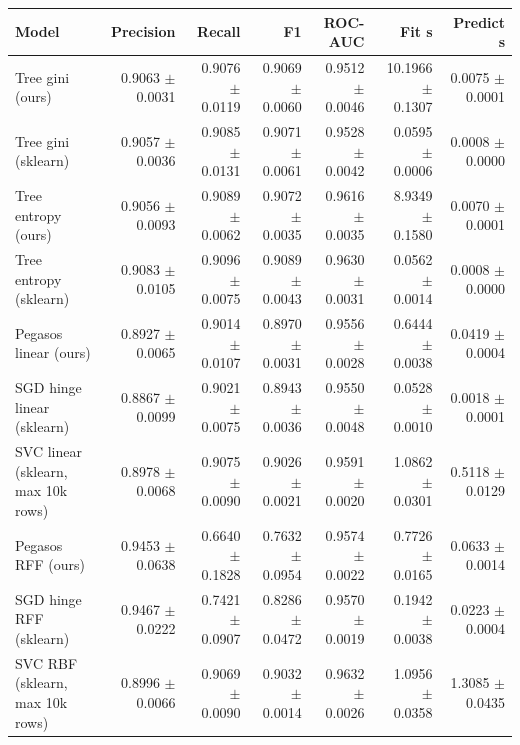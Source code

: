 \begin{tabular}{lrrrrrr}
\toprule
Model & Precision & Recall & F1 & ROC-AUC & Fit s & Predict s \\
\midrule
Tree gini (ours) & 0.9063 $\pm$ 0.0031 & 0.9076 $\pm$ 0.0119 & 0.9069 $\pm$ 0.0060 & 0.9512 $\pm$ 0.0046 & 10.1966 $\pm$ 0.1307 & 0.0075 $\pm$ 0.0001 \\
Tree gini (sklearn) & 0.9057 $\pm$ 0.0036 & 0.9085 $\pm$ 0.0131 & 0.9071 $\pm$ 0.0061 & 0.9528 $\pm$ 0.0042 & 0.0595 $\pm$ 0.0006 & 0.0008 $\pm$ 0.0000 \\
Tree entropy (ours) & 0.9056 $\pm$ 0.0093 & 0.9089 $\pm$ 0.0062 & 0.9072 $\pm$ 0.0035 & 0.9616 $\pm$ 0.0035 & 8.9349 $\pm$ 0.1580 & 0.0070 $\pm$ 0.0001 \\
Tree entropy (sklearn) & 0.9083 $\pm$ 0.0105 & 0.9096 $\pm$ 0.0075 & 0.9089 $\pm$ 0.0043 & 0.9630 $\pm$ 0.0031 & 0.0562 $\pm$ 0.0014 & 0.0008 $\pm$ 0.0000 \\
Pegasos linear (ours) & 0.8927 $\pm$ 0.0065 & 0.9014 $\pm$ 0.0107 & 0.8970 $\pm$ 0.0031 & 0.9556 $\pm$ 0.0028 & 0.6444 $\pm$ 0.0038 & 0.0419 $\pm$ 0.0004 \\
SGD hinge linear (sklearn) & 0.8867 $\pm$ 0.0099 & 0.9021 $\pm$ 0.0075 & 0.8943 $\pm$ 0.0036 & 0.9550 $\pm$ 0.0048 & 0.0528 $\pm$ 0.0010 & 0.0018 $\pm$ 0.0001 \\
SVC linear (sklearn, max 10k rows) & 0.8978 $\pm$ 0.0068 & 0.9075 $\pm$ 0.0090 & 0.9026 $\pm$ 0.0021 & 0.9591 $\pm$ 0.0020 & 1.0862 $\pm$ 0.0301 & 0.5118 $\pm$ 0.0129 \\
Pegasos RFF (ours) & 0.9453 $\pm$ 0.0638 & 0.6640 $\pm$ 0.1828 & 0.7632 $\pm$ 0.0954 & 0.9574 $\pm$ 0.0022 & 0.7726 $\pm$ 0.0165 & 0.0633 $\pm$ 0.0014 \\
SGD hinge RFF (sklearn) & 0.9467 $\pm$ 0.0222 & 0.7421 $\pm$ 0.0907 & 0.8286 $\pm$ 0.0472 & 0.9570 $\pm$ 0.0019 & 0.1942 $\pm$ 0.0038 & 0.0223 $\pm$ 0.0004 \\
SVC RBF (sklearn, max 10k rows) & 0.8996 $\pm$ 0.0066 & 0.9069 $\pm$ 0.0090 & 0.9032 $\pm$ 0.0014 & 0.9632 $\pm$ 0.0026 & 1.0956 $\pm$ 0.0358 & 1.3085 $\pm$ 0.0435 \\
\bottomrule
\end{tabular}

